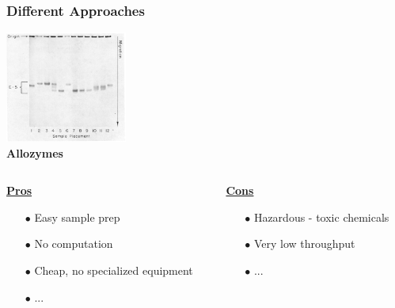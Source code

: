 \documentclass{beamer}
\begin{document}
	\begin{frame}
		\frametitle{Different Approaches}
		
		\centering 	\includegraphics[keepaspectratio, width  = 0.3\textwidth]{img/LewontinHubby}\\
		\vspace{10pt}
		\centering \textbf{		\Large Allozymes }
		\vspace{10pt}
		\begin{columns}
			\begin{column}{0.5\textwidth}
				\centering			\underline{\textbf{Pros}}
				\begin{itemize}
					\item[$\bullet$] Easy sample prep
					\item[$\bullet$] No computation
					\item[$\bullet$] Cheap, no specialized equipment	
					\item[$\bullet$] ... 
				\end{itemize}
			\end{column}
			\begin{column}{0.5\textwidth}
				\centering			\underline{\textbf{Cons}}
				\begin{itemize}
					\item[$\bullet$] Hazardous - toxic chemicals
					\item[$\bullet$] Very low throughput
					\item[$\bullet$] ... 
				\end{itemize}
			\end{column}
			
			
		\end{columns}
		
		
	\end{frame}
	
\end{document}
